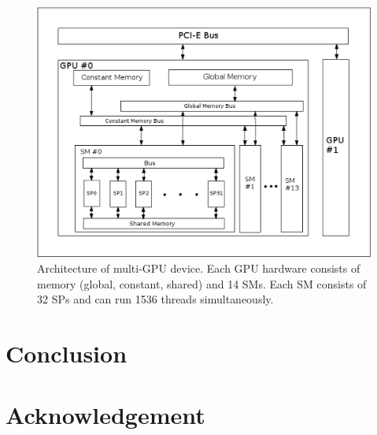 \documentclass[mathpazo]{cicp}
\theoremstyle{theoremlike}
\theoremstyle{definition}
\theoremstyle{remark}
\begin{document}
\begin{figure}[htb]
\centering\includegraphics[scale=0.60]{fig_gpu_arch}
\caption{
\label{fig:gpu-arch}
Architecture of multi-GPU device. Each GPU hardware consists of 
memory (global, constant, shared) and 14 SMs.
Each SM consists of 32 SPs and can run 1536 threads simultaneously.}
\end{figure}






\section{Conclusion}
\section{Acknowledgement}



\end{document}
